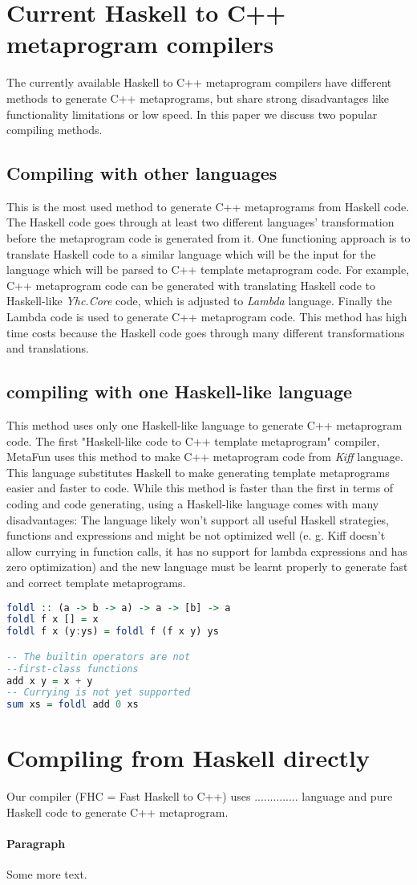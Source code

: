 \documentclass[twocolumn]{article}
\begin{document}
\section{Current Haskell to C++ metaprogram compilers}
The currently available Haskell to C++ metaprogram compilers have different methods to generate C++ metaprograms, but share strong disadvantages like functionality limitations or low speed. In this paper we discuss two popular compiling methods.
\subsection{Compiling with other languages}
This is the most used method to generate C++ metaprograms from Haskell code. The Haskell code goes through at least two different languages' transformation before the metaprogram code is generated from it. One functioning approach is to translate Haskell code to a similar language which will be the input for the language which will be parsed to C++ template metaprogram code. For example, C++ metaprogram code can be generated with translating Haskell code to Haskell-like \textit{Yhc.Core} code, which is adjusted to \textit{Lambda} language. Finally the Lambda code is used to generate C++ metaprogram code.\cite{porkolab2009c++} This method has high time costs because the Haskell code goes through many different transformations and translations.
\subsection{compiling with one Haskell-like language}
This method uses only one Haskell-like language to generate C++ metaprogram code. The first "Haskell-like code to C++ template metaprogram" compiler, MetaFun\cite{metafun} uses this method to make C++ metaprogram code from \textit{Kiff} language. This language substitutes Haskell to make generating template metaprograms easier and faster to code. While this method is faster than the first in terms of coding and code generating, using a Haskell-like language comes with many disadvantages: The language likely won't support all useful Haskell strategies, functions and expressions and might be not optimized well (e. g. Kiff doesn't allow currying in function calls, it has no support for lambda expressions and has zero optimization) and the new language must be learnt properly to generate fast and correct template metaprograms.
\begin{lstlisting}[language=Haskell, caption =Definition of sum using Kiff with comments of missing functions]
foldl :: (a -> b -> a) -> a -> [b] -> a
foldl f x [] = x
foldl f x (y:ys) = foldl f (f x y) ys

-- The builtin operators are not
--first-class functions
add x y = x + y
-- Currying is not yet supported 
sum xs = foldl add 0 xs   
\end{lstlisting}

\section{Compiling from Haskell directly}
Our compiler (FHC = Fast Haskell to C++) uses .............. language and pure Haskell code to generate C++ metaprogram.
\paragraph{Paragraph}

Some more text. 

 

\end{document}
